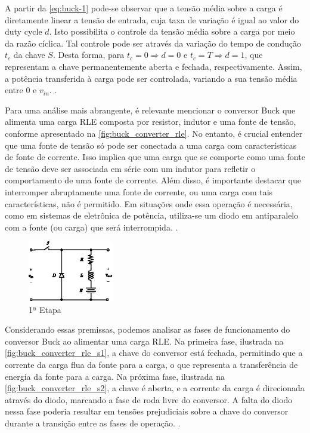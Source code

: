 A partir da \autoref{eq:buck-1} pode-se observar que a tensão média sobre a carga é diretamente linear a tensão de entrada, cuja taxa de variação é igual ao valor do duty cycle $d$. Isto possibilita o controle da tensão média sobre a carga por meio da razão cíclica. Tal controle pode ser através da variação do tempo de condução $t_c$ da chave $S$. Desta forma, para $t_c = 0 \Rightarrow d = 0$ e $t_c = T \Rightarrow d = 1$, que representam a chave permanentemente aberta e fechada, respectivamente. Assim, a potência transferida à carga pode ser controlada, variando a sua tensão média entre 0 e $v_{in}$. \cite{martins2008}.

Para uma análise mais abrangente, é relevante mencionar o conversor Buck que alimenta uma carga RLE composta por resistor, indutor e uma fonte de tensão, conforme apresentado na \autoref{fig:buck_converter_rle}. No entanto, é crucial entender que uma fonte de tensão só pode ser conectada a uma carga com características de fonte de corrente. Isso implica que uma carga que se comporte como uma fonte de tensão deve ser associada em série com um indutor para refletir o comportamento de uma fonte de corrente. Além disso, é importante destacar que interromper abruptamente uma fonte de corrente, ou uma carga com tais características, não é permitido. Em situações onde essa operação é necessária, como em sistemas de eletrônica de potência, utiliza-se um diodo em antiparalelo com a fonte (ou carga) que será interrompida. \cite{martins2008}.

\begin{figure}[H]
  \centering
  \includegraphics[width=0.33\textwidth]{figuras/buck_converter_rle.eps}
  \caption{1ª Etapa}
  \label{fig:buck_converter_rle}
\end{figure}

Considerando essas premissas, podemos analisar as fases de funcionamento do conversor Buck ao alimentar uma carga RLE. Na primeira fase, ilustrada na \autoref{fig:buck_converter_rle_s1}, a chave do conversor está fechada, permitindo que a corrente da carga flua da fonte para a carga, o que representa a transferência de energia da fonte para a carga. Na próxima fase, ilustrada na \autoref{fig:buck_converter_rle_s2}, a chave é aberta, e a corrente da carga é direcionada através do diodo, marcando a fase de roda livre do conversor. A falta do diodo nessa fase poderia resultar em tensões prejudiciais sobre a chave do conversor durante a transição entre as fases de operação. \cite{martins2008}.

